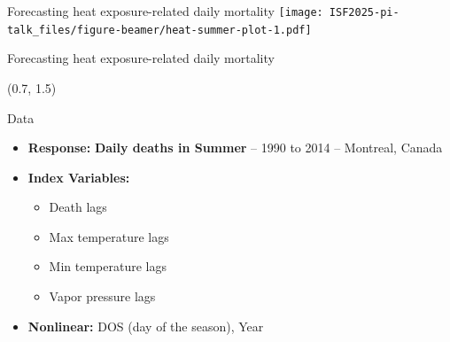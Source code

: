 \documentclass[
  12pt,
  ignorenonframetext,
  aspectratio=169,
]{beamer}
\begin{document}
\begin{frame}{Forecasting heat exposure-related daily mortality}
\label{forecasting-heat-exposure-related-daily-mortality}
\texttt{[image: ISF2025-pi-talk\_files/figure-beamer/heat-summer-plot-1.pdf]}
\end{frame}

\begin{frame}{Forecasting heat exposure-related daily mortality}
\label{forecasting-heat-exposure-related-daily-mortality-1}
\begin{textblock}{7}(0.7, 1.5)
\fontsize{11}{12}\sf
\begin{block}{Data}
  \begin{itemize}
    \item \color{violet} \textbf{Response:} \color{black} \textbf{Daily deaths in Summer} -- 1990 to 2014 -- Montreal, Canada
    \item \color{violet} \textbf{Index Variables:} 
      \begin{itemize}
        \item \color{black} Death lags
        \item \color{black} Max temperature lags
        \item \color{black} Min temperature lags
        \item \color{black} Vapor pressure lags
      \end{itemize}
    \item \color{violet}\textbf{Nonlinear:} \color{black} DOS (day of the season), Year \newline
  \end{itemize}
\end{block}
\end{textblock}
\end{frame}
\end{document}
